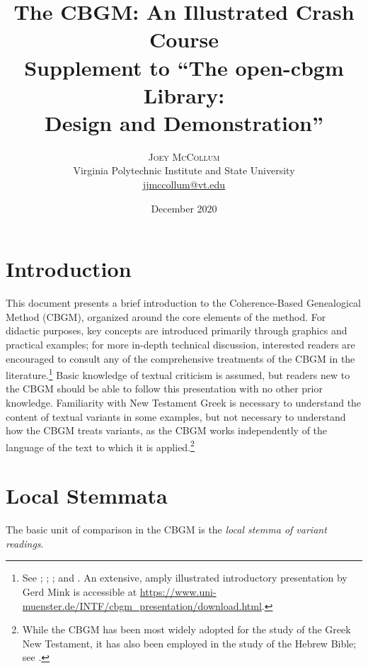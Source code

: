 \documentclass[a4paper, 12pt]{article}
\title{{\Large\titlefont The CBGM: An Illustrated Crash Course}\\{\large\titlefont\color{HokieStone}Supplement to ``The open-cbgm Library:}\\{\large\titlefont\color{HokieStone}Design and Demonstration''}}
\author{{\normalsize\sf\textsc{Joey McCollum}}\\{\normalsize\sf Virginia Polytechnic Institute and State University}\\{\normalsize\sf\href{mailto:jjmccollum@vt.edu}{jjmccollum@vt.edu}}}
\date{{\normalsize\sf 9 December 2020}}
\begin{document}
	\maketitle
	\section*{Introduction}
	This document presents a brief introduction to the Coherence-Based Genealogical Method (CBGM), organized around the core elements of the method. For didactic purposes, key concepts are introduced primarily through graphics and practical examples; for more in-depth technical discussion, interested readers are encouraged to consult any of the comprehensive treatments of the CBGM in the literature.\footnote{See \cite{Mink04}; \cite{Gurry16}; \cite{WG17}; and \cite{Gurry17}. An extensive, amply illustrated introductory presentation by Gerd Mink is accessible at \url{https://www.uni-muenster.de/INTF/cbgm_presentation/download.html}.} Basic knowledge of textual criticism is assumed, but readers new to the CBGM should be able to follow this presentation with no other prior knowledge. Familiarity with New Testament Greek is necessary to understand the content of textual variants in some examples, but not necessary to understand how the CBGM treats variants, as the CBGM works independently of the language of the text to which it is applied.\footnote{While the CBGM has been most widely adopted for the study of the Greek New Testament, it has also been employed in the study of the Hebrew Bible; see \cite{Ellis18}.}
	
	\section{Local Stemmata}\label{sec:local-stemmata}
	The basic unit of comparison in the CBGM is the \emph{local stemma of variant readings}. 
	
\end{document}
